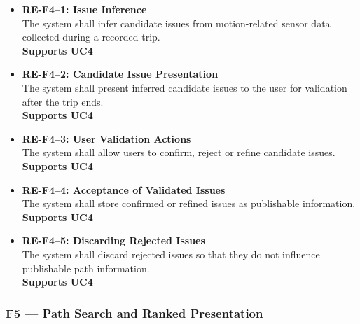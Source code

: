 \begin{itemize}

    \item \textbf{RE-F4--1: Issue Inference}\label{req:RE-F4-1}\\
    The system shall infer candidate issues from motion-related sensor data collected 
    during a recorded trip.\\
    \textbf{Supports UC4}

    \item \textbf{RE-F4--2: Candidate Issue Presentation}\label{req:RE-F4-2}\\
    The system shall present inferred candidate issues to the user for validation 
    after the trip ends.\\
    \textbf{Supports UC4}

    \item \textbf{RE-F4--3: User Validation Actions}\label{req:RE-F4-3}\\
    The system shall allow users to confirm, reject or refine candidate issues.\\
    \textbf{Supports UC4}

    \item \textbf{RE-F4--4: Acceptance of Validated Issues}\label{req:RE-F4-4}\\
    The system shall store confirmed or refined issues as publishable information.\\
    \textbf{Supports UC4}

    \item \textbf{RE-F4--5: Discarding Rejected Issues}\label{req:RE-F4-5}\\
    The system shall discard rejected issues so that they do not influence 
    publishable path information.\\
    \textbf{Supports UC4}

\end{itemize}

\subsubsection*{F5 --- Path Search and Ranked Presentation}\label{sec:F5}

